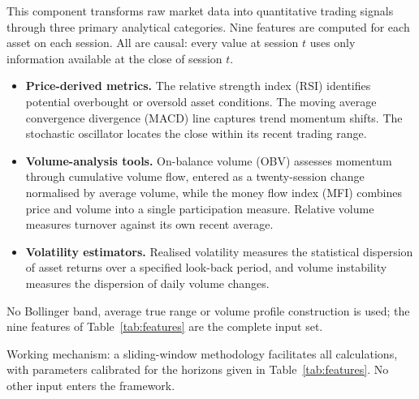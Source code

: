This component transforms raw market data into quantitative trading signals through three
primary analytical categories. Nine features are computed for each asset on each session.
All are causal: every value at session $t$ uses only information available at the close
of session $t$.

\begin{itemize}
\item \textbf{Price-derived metrics.} The relative strength index (RSI) identifies
potential overbought or oversold asset conditions. The moving average convergence
divergence (MACD) line captures trend momentum shifts. The stochastic oscillator locates
the close within its recent trading range.
\item \textbf{Volume-analysis tools.} On-balance volume (OBV) assesses momentum through
cumulative volume flow, entered as a twenty-session change normalised by average volume,
while the money flow index (MFI) combines price and volume into a single participation
measure. Relative volume measures turnover against its own recent average.
\item \textbf{Volatility estimators.} Realised volatility measures the statistical
dispersion of asset returns over a specified look-back period, and volume instability
measures the dispersion of daily volume changes.
\end{itemize}

No Bollinger band, average true range or volume profile construction is used; the nine
features of Table~\ref{tab:features} are the complete input set.

Working mechanism: a sliding-window methodology facilitates all calculations, with
parameters calibrated for the horizons given in Table~\ref{tab:features}. No other input
enters the framework.

